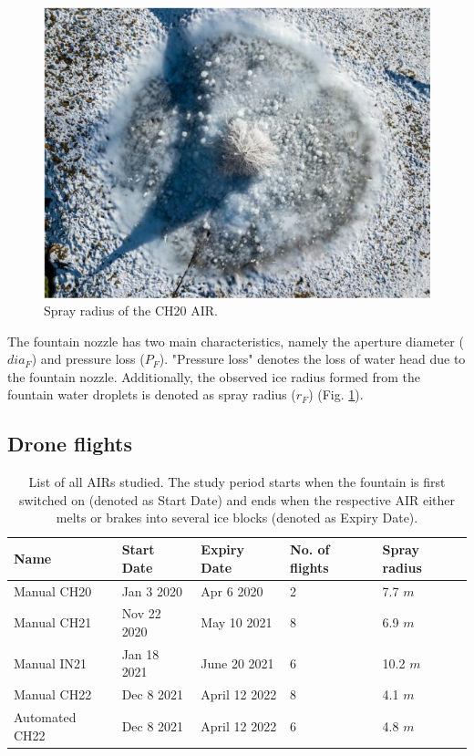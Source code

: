 \begin{figure}
	\centering
	\includegraphics[width=\textwidth/2]{figs/CH20_sprayrad.jpg}
	\caption{Spray radius of the CH20 \ac{AIR}. }
	\label{fig:CH20_rad}
\end{figure}

The fountain nozzle has two main characteristics, namely the aperture diameter ($dia_{F}$) and pressure loss
($P_{F}$). "Pressure loss" denotes the loss of water head due to the fountain nozzle. Additionally,
the observed ice radius formed from the fountain water droplets is denoted as spray radius ($r_F$) (Fig.
\ref{fig:CH20_rad}).


\subsection{Drone flights}

\begin{table}
	\centering
	\caption{List of all \ac{AIRs} studied. The study period starts when the fountain is first switched on
		(denoted as Start Date) and ends when the respective \ac{AIR} either melts or brakes into several ice blocks
		(denoted as Expiry Date). }
	\label{tab:AIRs}
	\begin{tabular}{|lllll|}
		\hline
		\textbf{Name}    & \textbf{Start Date} & \textbf{Expiry Date} & \textbf{No. of flights} & \textbf{Spray
		radius}                                                                                                 \\ \hline
		Manual CH20 & Jan 3 2020          & Apr 6 2020           & 2                       & 7.7 $m$       \\
		Manual CH21 & Nov 22 2020         & May 10 2021          & 8                       & 6.9 $m$       \\
		Manual IN21 & Jan 18 2021         & June 20 2021         & 6                       & 10.2 $m$      \\
		Manual CH22 & Dec 8 2021          & April 12 2022        & 8                       & 4.1 $m$       \\
		Automated CH22   & Dec 8 2021          & April 12 2022        & 6                       & 4.8 $m$       \\ \hline
	\end{tabular}
\end{table}

